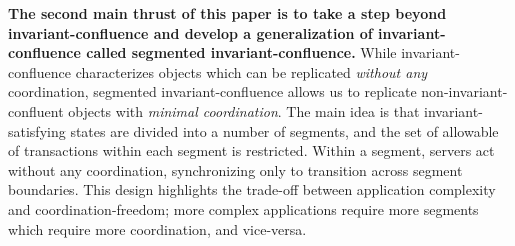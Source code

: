 

\textbf{The second main thrust of this paper is to take a step beyond
invariant-confluence and develop a generalization of invariant-confluence
called segmented invariant-confluence.} While invariant-confluence
characterizes objects which can be replicated \emph{without any} coordination,
segmented invariant-confluence allows us to replicate non-invariant-confluent
objects with \emph{minimal coordination}. The main idea is that
invariant-satisfying states are divided into a number of segments, and the set
of allowable of transactions within each segment is restricted. Within a
segment, servers act without any coordination, synchronizing only to transition
across segment boundaries. This design highlights the trade-off between
application complexity and coordination-freedom; more complex applications
require more segments which require more coordination, and vice-versa.



